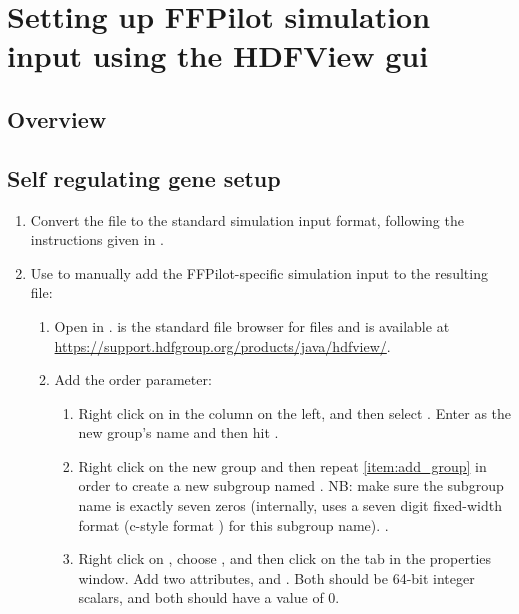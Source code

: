 \chapter{Setting up FFPilot simulation input using the HDFView gui}

\section{Overview}

\section{Self regulating gene setup}
\begin{enumerate}
    \item Convert the  file to the standard  simulation input format, following the instructions given in .
    \item Use  to manually add the FFPilot-specific simulation input to the resulting \\  file:
    \begin{enumerate}
        \item Open  in .  is the standard file browser for  files and is available at \\
        \href{HDF Group's website}{https://support.hdfgroup.org/products/java/hdfview/}.
        \item{Add the order parameter:}
        \begin{enumerate}
            \item\label{item:add_group} Right click on  in the column on the left, and then select . Enter  as the new group's name and then hit .
            \item Right click on the new  group and then repeat \ref{item:add_group} in order to create a new subgroup named . NB: make sure the subgroup name is exactly seven zeros (internally,  uses a seven digit fixed-width format (c-style format ) for this subgroup name). .
            \item Right click on , choose , and then click on the  tab in the properties window. Add two attributes,  and . Both should be 64-bit integer scalars, and both should have a value of 0.

\end{enumerate}
\end{enumerate}
\end{enumerate}

